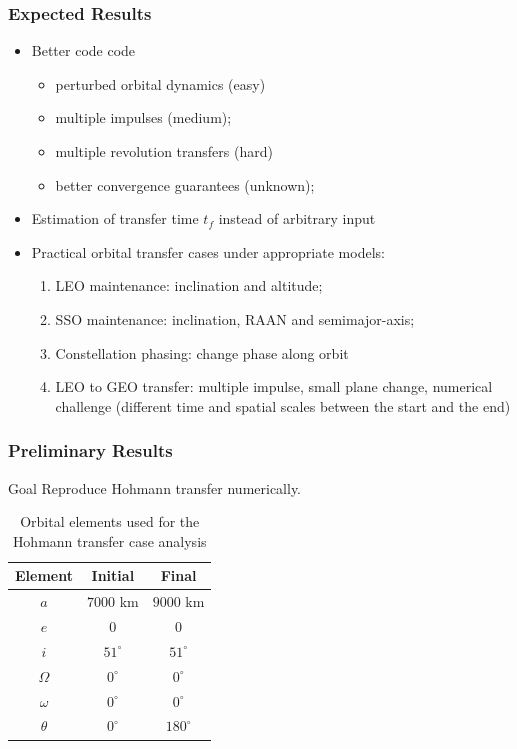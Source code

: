\documentclass{beamer}
\begin{document}
\begin{frame}
    \frametitle{Expected Results}

    \begin{itemize}\pause
        \item Better code code\pause
        \begin{itemize}
            \item perturbed orbital dynamics (easy)
            \item multiple impulses (medium);
            \item multiple revolution transfers (hard)
            \item better convergence guarantees (unknown);
        \end{itemize}
        \item Estimation of transfer time \(t_f\) instead of arbitrary input~\cite{embedded_lambert}\pause
        \item Practical orbital transfer cases under appropriate models:\pause
        \begin{enumerate}
            \item LEO maintenance: inclination and altitude;
            \item SSO maintenance: inclination, RAAN and semimajor-axis;
            \item Constellation phasing: change phase along orbit
            \item LEO to GEO transfer: multiple impulse, small plane change, numerical challenge (different time and spatial scales between the start and the end)
        \end{enumerate}
    \end{itemize}

\end{frame}

\begin{frame}
    \frametitle{Preliminary Results}
    \pause
    \begin{block}{Goal}
        Reproduce Hohmann transfer numerically.    
    \end{block}
    \pause
    \begin{table}[htbp]
        \centering
        \begin{tabular}{ccc} \toprule
            Element & Initial & Final \\ \midrule
            \(a\)      & \(7000\) km   & \(9000\) km   \\
            \(e\)      & \(0\)        & \(0\)        \\
            \(i\)      & \(51^\circ\) & \(51^\circ\) \\
            \(\Omega\) & \(0^\circ\)  & \(0^\circ\)  \\
            \(\omega\) & \(0^\circ\)  & \(0^\circ\)  \\
            \(\theta\) & \(0^\circ\)  & \(180^\circ\)  \\ \bottomrule
        \end{tabular}
        \caption{Orbital elements used for the Hohmann transfer case analysis}
        \label{tab:hohmann_orb_elems}
    \end{table}

    
\end{frame}
\end{document}
